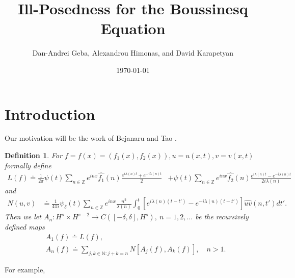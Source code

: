 \documentclass[12pt,reqno]{amsart}
\numberwithin{equation}{section}  %
\newcommand{\zz}{\mathbb{Z}}
\newcommand{\wh}{\widehat}
\newtheorem{definition}[theorem]{Definition}
\begin{document}
\title{Ill-Posedness for the Boussinesq Equation}
\author{Dan-Andrei Geba, Alexandrou Himonas, and David Karapetyan}
\address{Department of Mathematics, University of Rochester, Rochester, NY 14627}
\address{Department of Mathematics, University of Notre Dame, Notre Dame, IN 46556}
\address{Department of Mathematics, University of Notre Dame, Notre Dame, IN 46556}
\date{\today}
%
%
\maketitle
%
%
%
%
%
%
%
%
%
%
%
%
\section{Introduction}
Our motivation will be the work of Bejanaru and Tao
\cite{Bejenaru-Tao-2006-Sharp-well-posedness-and-ill-posedness}. 
%
\begin{definition}
  For $f =f(x)= (f_{1}(x), f_{2}(x)), u = u(x,t), v = v(x,t)$ formally define 
%
%
\begin{equation*}
\begin{split}
  L(f)
  \doteq \frac{1}{2 \pi} \psi(t) \sum_{n \in \zz} e^{inx}
  \wh{f_{1}}(n) \frac{e^{i\lambda(n)t} + e^{-i\lambda(n)t}}{2} 
  & + \psi(t) \sum_{n \in \zz} e^{inx}
  \wh{f_{2}}(n)\frac{e^{i\lambda(n)t} - e^{-i\lambda(n)t}}{2 i \lambda(n)} 
\end{split}
\end{equation*}
%
%
and
%
%
\begin{equation*}
\begin{split}
N(u, v)
& \doteq \frac{1}{4 \pi i} \psi_{\delta}(t) \sum_{n \in \zz} e^{inx} \frac{n^{2}}{\lambda(n)}
    \int_{0}^{t}[e^{i\lambda(n)(t-t')}-e^{-i\lambda(n)(t-t')}]
    \wh{uv}(n, t') dt'.
\end{split}
\end{equation*}
%
%
Then we let $A_{n}: H^{s} \times H^{s-2} \to C([-\delta, \delta], H^{s}), \ n = 1, 2, \dots$ be the
recursively defined maps
%
%
\begin{equation*}
\begin{split}
  & A_{1}(f) \doteq L(f),
  \\
  & A_{n}(f) \doteq \sum_{j, k \in \mathbb{N}: j + k = n} N\left[
  A_{j}(f), A_{k}(f) \right], \quad n > 1.
\end{split}
\end{equation*}
\end{definition}
%
%
%
For example, 
\end{document}
